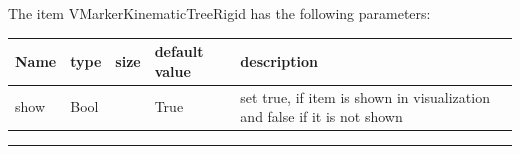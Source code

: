 \noindent The item VMarkerKinematicTreeRigid has the following parameters:
\begin{center}
  \footnotesize
  \begin{longtable}{| p{4.5cm} | p{2.5cm} | p{0.5cm} | p{2.5cm} | p{6cm} |}
    \hline
    \bf Name & \bf type & \bf size & \bf default value & \bf description \\ \hline
    show &     Bool &      &     True &     set true, if item is shown in visualization and false if it is not shown\\ \hline
\end{longtable}
\end{center}
\par\noindent\rule{\textwidth}{0.4pt}
\label{description_MarkerKinematicTreeRigid}
